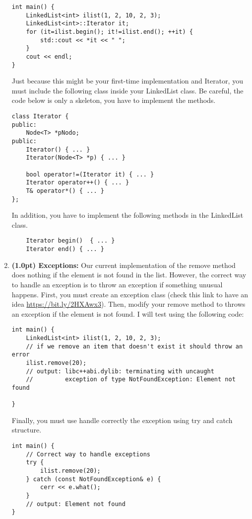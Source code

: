 \documentclass{article}
\begin{document}
\begin{enumerate}[label=\Alph*]
\begin{lstlisting}
int main() {
    LinkedList<int> ilist(1, 2, 10, 2, 3);
    LinkedList<int>::Iterator it;
    for (it=ilist.begin(); it!=ilist.end(); ++it) {
        std::cout << *it << " ";
    }
    cout << endl;
}
\end{lstlisting}

Just because this might be your first-time implementation and Iterator, you must include the following class inside your LinkedList class. Be careful, the code below is only a skeleton, you have to implement the methods. 

\begin{lstlisting}
class Iterator {
public:
    Node<T> *pNodo;
public:
    Iterator() { ... }
    Iterator(Node<T> *p) { ... }

    bool operator!=(Iterator it) { ... }
    Iterator operator++() { ... }
    T& operator*() { ... }
};
\end{lstlisting}

In addition, you have to implement the following methods in the LinkedList class. 

\begin{lstlisting}
    Iterator begin()  { ... }
    Iterator end() { ... }
\end{lstlisting}
  
  \item \textbf{(1.0pt) Exceptions:} Our current implementation of the remove method does nothing if the element is not found in the list. However, the correct way to handle an exception is to throw an exception if something unusual happens. First, you must create an exception class (check this link to have an idea \url{https://bit.ly/2HXAwx3}). Then, modify your remove method to throws an exception if the element is not found. I will test using the following code: 

\begin{lstlisting}
int main() {
    LinkedList<int> ilist(1, 2, 10, 2, 3);
    // if we remove an item that doesn't exist it should throw an error
    ilist.remove(20);
    // output: libc++abi.dylib: terminating with uncaught
    //         exception of type NotFoundException: Element not found

}
\end{lstlisting}

Finally, you must use handle correctly the exception using try and catch structure.
  
\begin{lstlisting}
int main() {
    // Correct way to handle exceptions
    try {
        ilist.remove(20);
    } catch (const NotFoundException& e) {
        cerr << e.what();
    }
    // output: Element not found
}
\end{lstlisting}
  
\end{enumerate}
\end{document}
